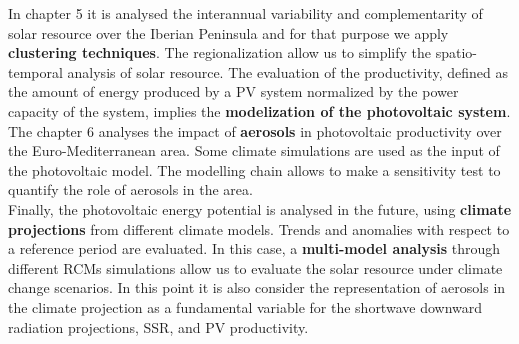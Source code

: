 
  In chapter 5 it is analysed the interannual variability and complementarity of solar resource over the Iberian Peninsula and for that purpose we apply \textbf{clustering techniques}. The regionalization allow us to simplify the spatio-temporal analysis of solar resource. The evaluation of the productivity, defined as the amount of energy produced by a PV system normalized by the power capacity of the system, implies the \textbf{modelization of the photovoltaic system}.\\
  
  The chapter 6 analyses the impact of \textbf{aerosols} in photovoltaic productivity over the Euro-Mediterranean area.  Some climate simulations are used as the input of the photovoltaic model. The modelling chain allows to make a sensitivity test to quantify the role of aerosols in the area.\\

  
  Finally, the photovoltaic energy potential is analysed in the future, using \textbf{climate projections} from different climate models. Trends and anomalies with respect to a reference period are evaluated. In this case, a \textbf{multi-model analysis} through different RCMs simulations allow us to evaluate the solar resource under climate change scenarios. In this point it is also consider the representation of aerosols in the climate projection as a fundamental variable for the shortwave downward radiation projections, SSR, and PV productivity.\\ 

